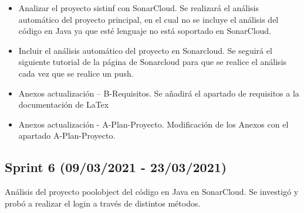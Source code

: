\begin{itemize}
	 \item Analizar el proyecto sistinf con SonarCloud. 
	 Se realizará el análisis automático del proyecto principal, en el cual no se incluye el análisis del código en Java ya que esté lenguaje no está soportado en SonarCloud.
	 \item Incluir el análisis automático del proyecto en Sonarcloud. 
	 Se seguirá el siguiente tutorial de la página de Sonarcloud para que se realice el análisis cada vez que se realice un push.  
	 \item Anexos actualización – B-Requisitos. 
	 Se añadirá el apartado de requisitos a la documentación de LaTex
	 \item Anexos actualización - A-Plan-Proyecto.
	  Modificación de los Anexos con el apartado A-Plan-Proyecto.	
	
\end{itemize}

\subsection{Sprint 6 (09/03/2021 - 23/03/2021)}
Análisis del proyecto poolobject del código en Java en SonarCloud. Se investigó y probó a realizar el login a través de distintos métodos.

